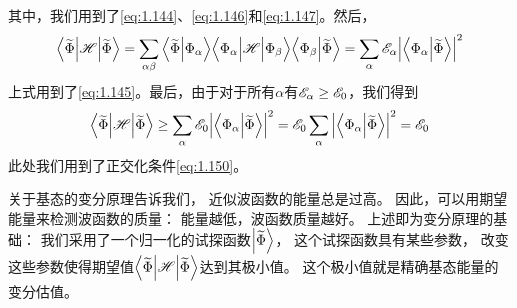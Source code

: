 其中，我们用到了\autoref{eq:1.144}、\autoref{eq:1.146}和\autoref{eq:1.147}。然后，
\begin{equation}
 \Big\langle\widetilde\Phi\Big\vert\mathscr{H}\Big\vert\widetilde\Phi\Big\rangle = \sum_{\alpha\beta}\Big\langle\widetilde\Phi\Big\vert\Phi_\alpha\Big\rangle\Big\langle\Phi_\alpha\Big\vert\mathscr{H}\Big\vert\Phi_\beta\Big\rangle\Big\langle\Phi_\beta\Big\vert\widetilde\Phi\Big\rangle = \sum_\alpha \mathscr{E}_\alpha \Big\vert\Big\langle\Phi_\alpha\Big\vert\widetilde\Phi\Big\rangle\Big\vert^2
 \label{eq:1.151}
\end{equation}
上式用到了\autoref{eq:1.145}。最后，由于对于所有$\alpha$有$\mathscr{E}_\alpha \geq \mathscr{E}_0$，我们得到
\begin{equation}
 \Big\langle\widetilde\Phi\Big\vert\mathscr{H}\Big\vert\widetilde\Phi\Big\rangle \geq \sum_\alpha \mathscr{E}_0\Big\vert\Big\langle\Phi_\alpha\Big\vert\widetilde\Phi\Big\rangle\Big\vert^2 = \mathscr{E}_0\sum_\alpha \Big\vert\Big\langle\Phi_\alpha\Big\vert\widetilde\Phi\Big\rangle\Big\vert^2 = \mathscr{E}_0
 \label{eq:1.152}
\end{equation}
此处我们用到了正交化条件\autoref{eq:1.150}。

关于基态的变分原理告诉我们，
近似波函数的能量总是过高。
因此，可以用期望能量来检测波函数的质量：
能量越低，波函数质量越好。
上述即为变分原理的基础：
我们采用了一个归一化的试探函数$\Ket{\widetilde\Phi}$，
这个试探函数具有某些参数，
改变这些参数使得期望值$\left\langle \widetilde\Phi\middle\vert \mathscr{H} \middle\vert \widetilde\Phi\right\rangle$达到其极小值。
这个极小值就是精确基态能量的变分估值。

